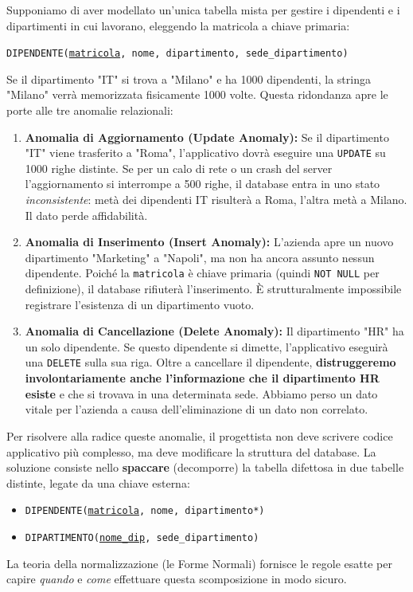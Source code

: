 \begin{example}
Supponiamo di aver modellato un'unica tabella mista per gestire i dipendenti e i dipartimenti in cui lavorano, eleggendo la matricola a chiave primaria:

\texttt{DIPENDENTE(\underline{matricola}, nome, dipartimento, sede\_dipartimento)}

Se il dipartimento "IT" si trova a "Milano" e ha 1000 dipendenti, la stringa "Milano" verrà memorizzata fisicamente 1000 volte. Questa ridondanza apre le porte alle tre anomalie relazionali:

\begin{enumerate}
    \item \textbf{Anomalia di Aggiornamento (Update Anomaly):} 
    Se il dipartimento "IT" viene trasferito a "Roma", l'applicativo dovrà eseguire una \texttt{UPDATE} su 1000 righe distinte. Se per un calo di rete o un crash del server l'aggiornamento si interrompe a 500 righe, il database entra in uno stato \textit{inconsistente}: metà dei dipendenti IT risulterà a Roma, l'altra metà a Milano. Il dato perde affidabilità.
    
    \item \textbf{Anomalia di Inserimento (Insert Anomaly):}
    L'azienda apre un nuovo dipartimento "Marketing" a "Napoli", ma non ha ancora assunto nessun dipendente. Poiché la \texttt{matricola} è chiave primaria (quindi \texttt{NOT NULL} per definizione), il database rifiuterà l'inserimento. È strutturalmente impossibile registrare l'esistenza di un dipartimento vuoto.
    
    \item \textbf{Anomalia di Cancellazione (Delete Anomaly):}
    Il dipartimento "HR" ha un solo dipendente. Se questo dipendente si dimette, l'applicativo eseguirà una \texttt{DELETE} sulla sua riga. Oltre a cancellare il dipendente, \textbf{distruggeremo involontariamente anche l'informazione che il dipartimento HR esiste} e che si trovava in una determinata sede. Abbiamo perso un dato vitale per l'azienda a causa dell'eliminazione di un dato non correlato.
\end{enumerate}
\end{example}

Per risolvere alla radice queste anomalie, il progettista non deve scrivere codice applicativo più complesso, ma deve modificare la struttura del database. La soluzione consiste nello \textbf{spaccare} (decomporre) la tabella difettosa in due tabelle distinte, legate da una chiave esterna:
\begin{itemize}
    \item \texttt{DIPENDENTE(\underline{matricola}, nome, dipartimento*)}
    \item \texttt{DIPARTIMENTO(\underline{nome\_dip}, sede\_dipartimento)}
\end{itemize}
La teoria della normalizzazione (le Forme Normali) fornisce le regole esatte per capire \textit{quando} e \textit{come} effettuare questa scomposizione in modo sicuro.


